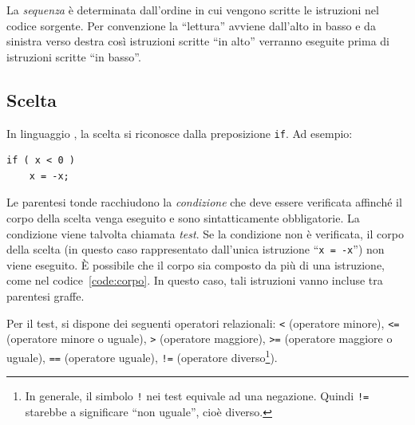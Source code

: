La \emph{sequenza} è determinata dall'ordine in cui vengono scritte le istruzioni nel codice sorgente.
Per convenzione la ``lettura'' avviene dall'alto in basso e da sinistra verso destra così istruzioni scritte ``in alto'' verranno eseguite prima di istruzioni scritte ``in basso''.

		\subsection{Scelta}
In linguaggio , la scelta si riconosce dalla preposizione \lstinline!if!. Ad esempio:

\begin{lstlisting}
if ( x < 0 )
	x = -x;
\end{lstlisting}
Le parentesi tonde racchiudono la \emph{condizione} che deve essere verificata affinché il corpo della scelta venga eseguito e sono sintatticamente obbligatorie.
La condizione viene talvolta chiamata \emph{test}.
Se la condizione non è verificata, il corpo della scelta (in questo caso rappresentato dall'unica istruzione ``\lstinline!x = -x!'') non viene eseguito.
\`E possibile che il corpo sia composto da più di una istruzione, come nel codice~\ref{code:corpo}.
In questo caso, tali istruzioni vanno incluse tra parentesi graffe.

Per  il test, si dispone dei seguenti operatori relazionali: \lstinline!<! (operatore minore), \lstinline!<=! (operatore minore o uguale), \lstinline!>! (operatore maggiore), \lstinline!>=! (operatore maggiore o uguale), \lstinline!==! (operatore uguale), \lstinline?!=? (operatore diverso\footnote{In generale, il simbolo \lstinline?!? nei test equivale ad una negazione. Quindi \lstinline?!=? starebbe a significare ``non uguale'', cioè diverso.}).


